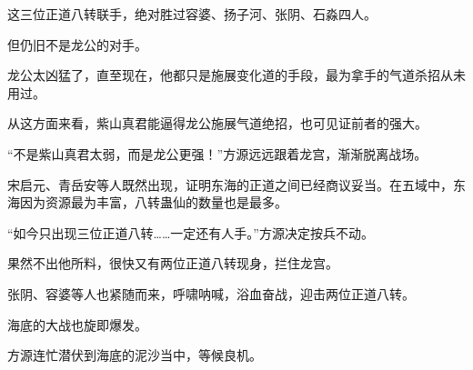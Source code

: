 \begin{this_body}
这三位正道八转联手，绝对胜过容婆、扬子河、张阴、石淼四人。

但仍旧不是龙公的对手。

龙公太凶猛了，直至现在，他都只是施展变化道的手段，最为拿手的气道杀招从未用过。

从这方面来看，紫山真君能逼得龙公施展气道绝招，也可见证前者的强大。

“不是紫山真君太弱，而是龙公更强！”方源远远跟着龙宫，渐渐脱离战场。

宋启元、青岳安等人既然出现，证明东海的正道之间已经商议妥当。在五域中，东海因为资源最为丰富，八转蛊仙的数量也是最多。

“如今只出现三位正道八转……一定还有人手。”方源决定按兵不动。

果然不出他所料，很快又有两位正道八转现身，拦住龙宫。

张阴、容婆等人也紧随而来，呼啸呐喊，浴血奋战，迎击两位正道八转。

海底的大战也旋即爆发。

方源连忙潜伏到海底的泥沙当中，等候良机。

\end{this_body}

